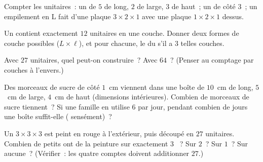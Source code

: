 \begin{exercise}[$\star$]\label{exo:g5:solids:6}
Compter les  unitaires~: un  de $5$ de long, $2$ de large,
$3$ de haut~; un  de côté $3$~; un empilement en L fait d'une
plaque $3 \times 2 \times 1$ avec une plaque $1 \times 2 \times 1$
dessus.
\end{exercise}

\begin{exercise}[$\star$]\label{exo:g5:solids:7}
Un  contient exactement $12$  unitaires en une couche.
Donner deux formes de couche possibles ($L \times \ell$), et pour
chacune, le  du  s'il a $3$ telles couches.
\end{exercise}

\begin{exercise}[$\star$]\label{exo:g5:solids:8}
Avec $27$  unitaires, quel  peut-on construire~? Avec
$64$~? (Penser au comptage par couches à l'envers.)
\end{exercise}

\begin{exercise}[$\star\star$]\label{exo:g5:solids:9}
Des morceaux de sucre de côté $1$~cm viennent dans une boîte de
$10$~cm de long, $5$~cm de large, $4$~cm de haut (dimensions
intérieures). Combien de morceaux de sucre tiennent~? Si une
famille en utilise $6$ par jour, pendant combien de jours une boîte
suffit-elle ( sensément)~?
\end{exercise}

\begin{exercise}[$\star\star$]\label{exo:g5:solids:10}
Un  $3 \times 3 \times 3$ est peint en rouge à l'extérieur,
puis découpé en $27$  unitaires. Combien de petits  ont
de la peinture sur exactement $3$ ~? Sur $2$~? Sur $1$~? Sur
aucune~? (Vérifier~: les quatre comptes doivent additionner $27$.)
\end{exercise}
